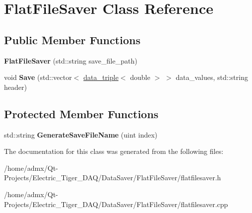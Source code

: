 \hypertarget{class_flat_file_saver}{\section{Flat\+File\+Saver Class Reference}
\label{class_flat_file_saver}
}
\subsection*{Public Member Functions}
\begin{DoxyCompactItemize}
\item 
\hypertarget{class_flat_file_saver_aa755dafabdc59a86dc260cd24d201c3e}{{\bfseries Flat\+File\+Saver} (std\+::string save\+\_\+file\+\_\+path)}\label{class_flat_file_saver_aa755dafabdc59a86dc260cd24d201c3e}

\item 
\hypertarget{class_flat_file_saver_ac4e8effd59db9c91d6df56869c31ffd0}{void {\bfseries Save} (std\+::vector$<$ \hyperlink{structdata__triple}{data\+\_\+triple}$<$ double $>$ $>$ data\+\_\+values, std\+::string header)}\label{class_flat_file_saver_ac4e8effd59db9c91d6df56869c31ffd0}

\end{DoxyCompactItemize}
\subsection*{Protected Member Functions}
\begin{DoxyCompactItemize}
\item 
\hypertarget{class_flat_file_saver_ad23419439ebf98aaac5affc720d92b73}{std\+::string {\bfseries Generate\+Save\+File\+Name} (uint index)}\label{class_flat_file_saver_ad23419439ebf98aaac5affc720d92b73}

\end{DoxyCompactItemize}


The documentation for this class was generated from the following files\+:\begin{DoxyCompactItemize}
\item 
/home/admx/\+Qt-\/\+Projects/\+Electric\+\_\+\+Tiger\+\_\+\+D\+A\+Q/\+Data\+Saver/\+Flat\+File\+Saver/flatfilesaver.\+h\item 
/home/admx/\+Qt-\/\+Projects/\+Electric\+\_\+\+Tiger\+\_\+\+D\+A\+Q/\+Data\+Saver/\+Flat\+File\+Saver/flatfilesaver.\+cpp\end{DoxyCompactItemize}
